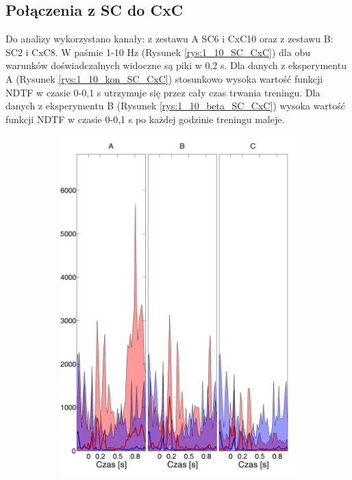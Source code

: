\documentclass{pracamgr_2}
\begin{document}
	\subsection{Połączenia z SC do CxC}
	Do analizy wykorzystano kanały: z zestawu A SC6 i CxC10 oraz z zestawu B: SC2 i CxC8.
	W paśmie 1-10 Hz (Rysunek \ref{rys:1_10_SC_CxC}) dla obu warunków doświadczalnych widoczne są piki w 0,2 s. Dla danych z eksperymentu A (Rysunek \ref{rys:1_10_kon_SC_CxC}) stosunkowo wysoka wartość funkcji NDTF w czasie 0-0,1 s utrzymuje się przez cały czas trwania treningu. Dla danych z eksperymentu B (Rysunek \ref{rys:1_10_beta_SC_CxC}) wysoka wartość funkcji NDTF w czasie 0-0,1 s po każdej godzinie treningu maleje.
	\begin{figure}[h]
		\begin{subfigure}{.5\textwidth}
			\centering
			\includegraphics[width=1.\linewidth]{kontrola15_1-10_z_SC6_do_CxC102.png}

\end{subfigure}
\end{figure}
\end{document}
